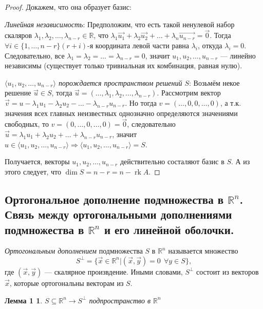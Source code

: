 \documentclass[a4paper, 12pt]{article}
\DeclareMathOperator{\rk}{rk}
\newtheorem*{que52lemma1}{Лемма 1}
\begin{document}
\begin{proof}
Докажем, что она образует базис:

\textit{Линейная независимость}: Предположим, что есть такой ненулевой набор скаляров $\lambda_1, \lambda_2, \ldots ,\lambda_{n-r} \in \mathbb{R}$, что $\lambda_1\vec{u_1} + \lambda_2\vec{u_2} + \ldots + \lambda_n\vec{u_{n-r}} = \vec{0}$. Тогда $\forall i \in \{1, \ldots , n - r\} (r + i)$-я координата левой части равна $\lambda_i$, откуда $\lambda_i = 0$. Следовательно, все $\lambda_1 = \lambda_2 = \ldots = \lambda_{n-r} = 0$, значит $u_1, u_2, \ldots , u_{n-r}$ --- линейно независимы (существует только тривиальная их комбинация, равная нулю).

\textit{$\langle u_1, u_2, \ldots , u_{n-r} \rangle$ порождается пространством решений $S$}:
Возьмём некое решение $\vec u \in S$, тогда $\vec u = (\ldots, \lambda_1, \lambda_2, \ldots ,\lambda_{n-r})$. Рассмотрим вектор $\vec v = u - \lambda_1 u_1 - \lambda_2 u_2 - \ldots - \lambda_{n-r} u_{n-r}$. Но тогда $v = (\ldots, 0, 0, \ldots , 0)$, а т.к. значения всех главных неизвестных однозначно определяются значениями свободных, то $v = (0, \ldots, 0, \ldots , 0) = \vec 0$, следовательно $\vec u = \lambda_1 u_1 + \lambda_2 u_2 + \ldots + \lambda_{n-r} u_{n-r}$, значит $u \in \langle u_1, u_2, \ldots , u_{n-r} \rangle \Rightarrow \langle u_1, u_2, \ldots , u_{n-r} \rangle = S$.

Получается, векторы $u_1, u_2, \ldots , u_{n-r}$ действительно состаляют базис в $S$. А из этого следует, что $\dim{S} = n - r = n - \rk A$. 
\end{proof}


\subsection{Ортогональное дополнение подмножества в $\mathbb{R}^n$. Связь между ортогональными дополнениями подмножества в $\mathbb{R}^n$ и его линейной оболочки.}

\textit{Ортогональным дополнением} подмножества $S$ в $\mathbb{R}^n$ называется множество
$$
S^{\perp} = \{\vec{x} \in \mathbb{R}^n | (\vec{x},\vec{y})=0\ \  \forall y \in S \},
$$
где $(\vec x, \vec y)$ — скалярное произвдение. Иными словами, $S^{\perp}$ состоит из векторов $\vec{x}$, которые ортогональны векторам из $S$.

\begin{que52lemma1}
$ S \subseteq \mathbb{R}^n \rightarrow S^{\perp} $ подпространство в $\mathbb{R}^n$
\end{que52lemma1}
\end{document}

